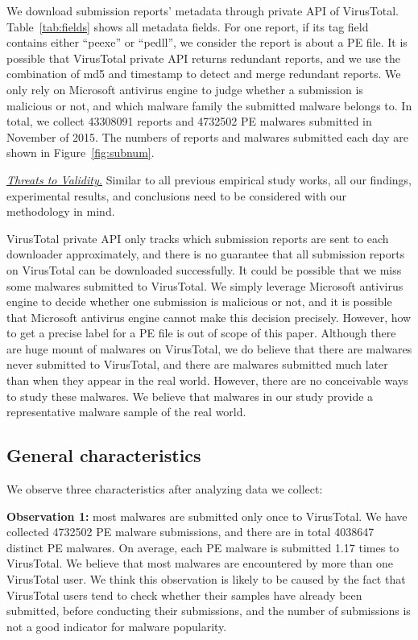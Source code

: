 We download submission reports' metadata through private API of VirusTotal.
Table~\ref{tab:fields} shows all metadata fields.
For one report, if its tag field contains either ``peexe'' or ``pedll'', 
we consider the report is about a PE file. 
It is possible that VirusTotal private API returns redundant reports, 
and we use the combination of md5 and timestamp to detect and merge redundant reports.
We only rely on Microsoft antivirus engine to judge whether a submission is malicious or not, 
and which malware family the submitted malware belongs to. 
In total, we collect 43308091 reports and 4732502 PE malwares submitted
in November of 2015. 
The numbers of reports and malwares submitted each day are shown in Figure~\ref{fig:subnum}.

\textit{\underline{Threats to Validity.}}
Similar to all previous empirical study works, all our findings, experimental results, 
and conclusions need to be considered with our methodology in mind. 

VirusTotal private API only tracks which submission reports are sent to each downloader approximately, 
and there is no guarantee that all submission reports on VirusTotal can be downloaded successfully. 
It could be possible that we miss some malwares submitted to VirusTotal. 
We simply leverage Microsoft antivirus engine to decide whether one submission is malicious or not, 
and it is possible that Microsoft antivirus engine cannot make this decision precisely. 
However, how to get a precise label for a PE file is out of scope of this paper.  
Although there are huge mount of malwares on VirusTotal, we do believe that there are malwares never submitted to VirusTotal, 
and there are malwares submitted much later than when they appear in the real world.
However, there are no conceivable ways to study these malwares. 
We believe that malwares in our study provide a representative malware sample of the real world. 

\subsection{General characteristics}

We observe three characteristics after analyzing data we collect:

{\bf Observation 1:} 
most malwares are submitted only once to VirusTotal. 
We have collected 4732502 PE malware submissions, and there are in total 4038647 distinct PE malwares. 
On average, each PE malware is submitted 1.17 times to VirusTotal. 
We believe that most malwares are encountered by more than one VirusTotal user. 
We think this observation is likely to be caused by the fact that VirusTotal users 
tend to check whether their samples have already been submitted, 
before conducting their submissions, 
and the number of submissions is not a good indicator for malware popularity. 


